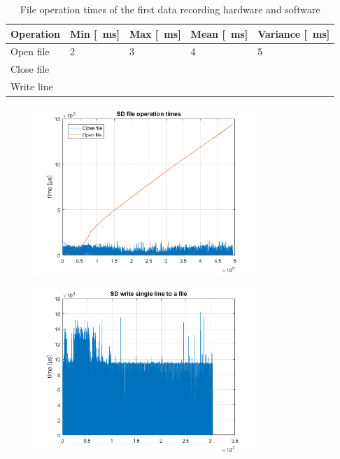 \documentclass[english,12pt,a4paper,pdftex,elec,utf8]{aaltothesis}
\begin{document}
\begin{table} \caption{File operation times of the first data recording hardware and software}
\centering
\begin{tabular}{| l | l | l | l | l |}
\hline
Operation & Min [\SI{}{\milli \second}] & Max [\SI{}{\milli \second}] & Mean [\SI{}{\milli \second}]& Variance [\SI{}{\milli \second}]\\ \hline
Open file & 2 & 3 & 4 & 5 \\ \hline
Close file &  &  &  &  \\ \hline
Write line &  &  &  &  \\ \hline
\end{tabular}
\end{table}

\begin{figure}[htb]
\centering
\includegraphics[width = 0.75\textwidth]{figures/openclosetimes_vanha.png}
\caption{} \label{}
\end{figure}

\begin{figure}[htb]
\centering
\includegraphics[width = 0.75\textwidth]{figures/writetimes_vanharauta.png}
\caption{} \label{}
\end{figure}
\end{document}
